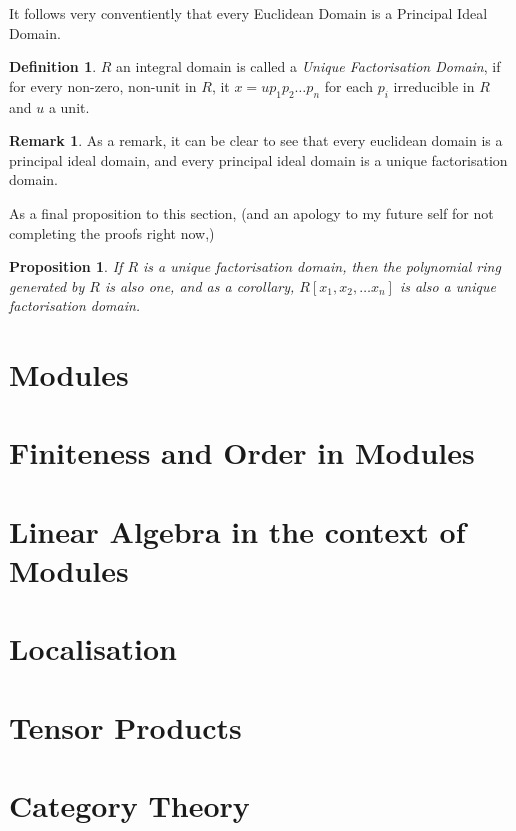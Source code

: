 \documentclass[12pt]{book}
\newtheorem{proposition}{Proposition}[section]
\theoremstyle{definition}
\newtheorem*{definition}{Definition}
\newtheorem*{remark}{Remark}
\begin{document}
It follows very conventiently that every Euclidean Domain is a Principal Ideal Domain.
\begin{definition}
    $R$ an integral domain is called a \textit{Unique Factorisation Domain}, if for every non-zero, non-unit in $R$, it $x = up_1p_2\ldots p_n$ for each $p_i$ irreducible in $R$ and $u$ a unit.
\end{definition}
\begin{remark}
    As a remark, it can be clear to see that every euclidean domain is a principal ideal domain, and every principal ideal domain is a unique factorisation domain.
\end{remark}
As a final proposition to this section, (and an apology to my future self for not completing the proofs right now,)
\begin{proposition}
    If $R$ is a unique factorisation domain, then the polynomial ring generated by $R$ is also one, and as a corollary, $R[x_1, x_2, \ldots x_n]$ is also a unique factorisation domain.
\end{proposition}
\chapter{Modules}
\chapter{Finiteness and Order in Modules}
\chapter{Linear Algebra in the context of Modules}
\chapter{Localisation}
\chapter{Tensor Products}
\chapter{Category Theory}
\end{document}
